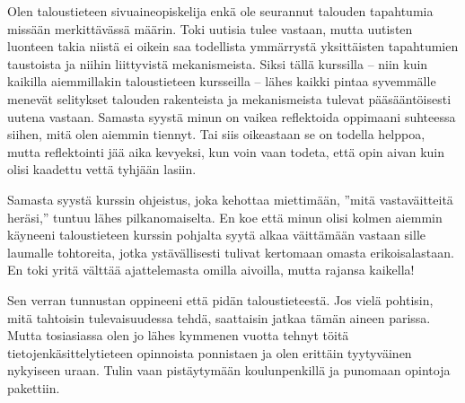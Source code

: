 \documentclass[12pt]{article}
\begin{document}
Olen taloustieteen sivuaineopiskelija enkä ole seurannut talouden tapahtumia missään merkittävässä määrin. Toki uutisia tulee vastaan, mutta uutisten luonteen takia niistä ei oikein saa todellista ymmärrystä yksittäisten tapahtumien taustoista ja niihin liittyvistä mekanismeista. Siksi tällä kurssilla -- niin kuin kaikilla aiemmillakin taloustieteen kursseilla --  lähes kaikki pintaa syvemmälle menevät selitykset talouden rakenteista ja mekanismeista tulevat pääsääntöisesti uutena vastaan. Samasta syystä minun on vaikea reflektoida oppimaani suhteessa siihen, mitä olen aiemmin tiennyt. Tai siis oikeastaan se on todella helppoa, mutta reflektointi jää aika kevyeksi, kun voin vaan todeta, että opin aivan kuin olisi kaadettu vettä tyhjään lasiin.

Samasta syystä kurssin ohjeistus, joka kehottaa miettimään, ''mitä vastaväitteitä heräsi,'' tuntuu lähes pilkanomaiselta. En koe että minun olisi kolmen aiemmin käyneeni taloustieteen kurssin pohjalta syytä alkaa väittämään vastaan sille laumalle tohtoreita, jotka ystävällisesti tulivat kertomaan omasta erikoisalastaan. En toki yritä välttää ajattelemasta omilla aivoilla, mutta rajansa kaikella!

Sen verran tunnustan oppineeni että pidän taloustieteestä. Jos vielä pohtisin, mitä tahtoisin tulevaisuudessa tehdä, saattaisin jatkaa tämän aineen parissa. Mutta tosiasiassa olen jo lähes kymmenen vuotta tehnyt töitä tietojenkäsittelytieteen opinnoista ponnistaen ja olen erittäin tyytyväinen nykyiseen uraan. Tulin vaan pistäytymään koulunpenkillä ja punomaan opintoja pakettiin.
\end{document}
